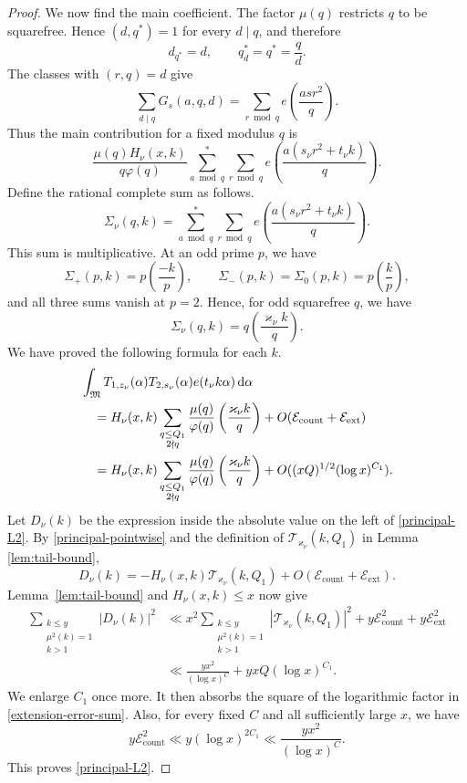 \documentclass[10pt,a4paper]{amsart}
\newcommand{\dif}{\mathrm{d}}
\newcommand{\majorarc}{\mathfrak{M}}
\begin{document}
\begin{proof}
We now find the main coefficient.
The factor $\mu(q)$ restricts $q$ to be squarefree.  Hence
$(d,q^*)=1$ for every $d\mid q$, and therefore
\[
 d_{q^*}=d,\qquad q^*_{d}=q^*=\frac qd.
\]
The classes with $(r,q)=d$
give
\[
 \sum_{d\mid q}G_s(a,q,d)
 =\sum_{r\bmod q}e\left(\frac{asr^2}{q}\right).
\]
Thus the main contribution for a fixed modulus $q$ is
\begin{equation*}\label{fixed-q-principal-contribution}
 \frac{\mu(q)H_\nu(x,k)}{q\varphi(q)}
 \sum_{a\bmod q}^{*}\sum_{r\bmod q}
 e\left(\frac{a(s_\nu r^2+t_\nu k)}q\right).
\end{equation*}
Define the rational complete sum as follows.
\[
 \Sigma_\nu(q,k)=
 \sum_{a\bmod q}^{*}\sum_{r\bmod q}
 e\left(\frac{a(s_\nu r^2+t_\nu k)}q\right).
\]
This sum is multiplicative.  At an odd prime $p$, we have
\[
 \Sigma_+(p,k)=p\left(\frac{-k}{p}\right),\qquad
 \Sigma_-(p,k)=\Sigma_0(p,k)=p\left(\frac{k}{p}\right),
\]
and all three sums vanish at $p=2$.  Hence, for odd squarefree $q$, we
have
\[
 \Sigma_\nu(q,k)=q\left(\frac{\varkappa_\nu k}{q}\right).
\]
We have proved the following formula for each $k$.
\begin{align}
 &\int_{\majorarc}T_{1,z_\nu}(\alpha)T_{2,s_\nu}(\alpha)
 e(t_\nu k\alpha)\,\dif\alpha\notag\\
 &\quad=H_\nu(x,k)
 \sum_{\substack{q\leq Q_1\\2\nmid q}}
 \frac{\mu(q)}{\varphi(q)}
 \left(\frac{\varkappa_\nu k}{q}\right)
 +O(\mathcal E_{\mathrm{count}}+\mathcal E_{\mathrm{ext}})
 \notag\\
 &\quad=H_\nu(x,k)
 \sum_{\substack{q\leq Q_1\\2\nmid q}}
 \frac{\mu(q)}{\varphi(q)}
 \left(\frac{\varkappa_\nu k}{q}\right)
 +O((xQ)^{1/2}(\log x)^{C_1}).                 \label{principal-pointwise}
\end{align}
Let $D_\nu(k)$ be the expression inside the absolute value on the left
of \eqref{principal-L2}.
By \eqref{principal-pointwise} and the definition of
$\mathcal T_{\varkappa_\nu}(k,Q_1)$ in Lemma \ref{lem:tail-bound},
\[
 D_\nu(k)
 =-H_\nu(x,k)\mathcal T_{\varkappa_\nu}(k,Q_1)
 +O(\mathcal E_{\mathrm{count}}+\mathcal E_{\mathrm{ext}}).
\]
Lemma~\ref{lem:tail-bound} and $H_\nu(x,k)\leq x$ now give
\begin{align*}
 \sum_{\substack{k\leq y\\\mu^2(k)=1\\k>1}}|D_\nu(k)|^2
 &\ll x^2\sum_{\substack{k\leq y\\\mu^2(k)=1\\k>1}}
       |\mathcal T_{\varkappa_\nu}(k,Q_1)|^2
       +y\mathcal E_{\mathrm{count}}^2
       +y\mathcal E_{\mathrm{ext}}^2\\
 &\ll \frac{yx^2}{(\log x)^C}
       +yxQ(\log x)^{C_1}.
\end{align*}
We enlarge $C_1$ once more.  It then absorbs the square of the
logarithmic factor in \eqref{extension-error-sum}.  Also, for every
fixed $C$ and all sufficiently large $x$, we have
\[
 y\mathcal E_{\mathrm{count}}^2
 \ll y(\log x)^{2C_1}
 \ll\frac{yx^2}{(\log x)^C}.
\]
This proves \eqref{principal-L2}.
\end{proof}
\end{document}
